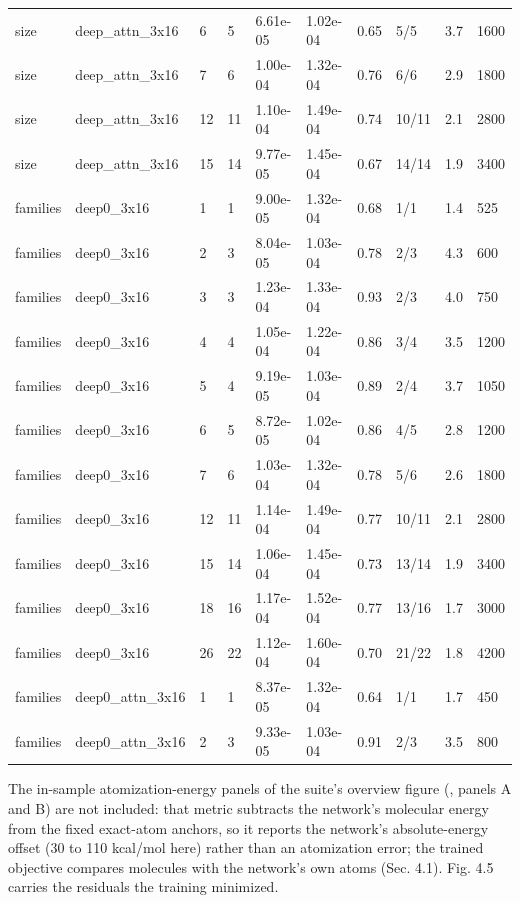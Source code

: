 \documentclass[10pt,a4paper]{article}
\begin{document}
\begin{landscape}
\begin{scriptsize}
\begin{longtable}{llllllllll}
size & deep\_attn\_3x16 & 6 & 5 & 6.61e-05 & 1.02e-04 & 0.65 & 5/5 & 3.7 & 1600 \\
size & deep\_attn\_3x16 & 7 & 6 & 1.00e-04 & 1.32e-04 & 0.76 & 6/6 & 2.9 & 1800 \\
size & deep\_attn\_3x16 & 12 & 11 & 1.10e-04 & 1.49e-04 & 0.74 & 10/11 & 2.1 & 2800 \\
size & deep\_attn\_3x16 & 15 & 14 & 9.77e-05 & 1.45e-04 & 0.67 & 14/14 & 1.9 & 3400 \\
families & deep0\_3x16 & 1 & 1 & 9.00e-05 & 1.32e-04 & 0.68 & 1/1 & 1.4 & 525 \\
families & deep0\_3x16 & 2 & 3 & 8.04e-05 & 1.03e-04 & 0.78 & 2/3 & 4.3 & 600 \\
families & deep0\_3x16 & 3 & 3 & 1.23e-04 & 1.33e-04 & 0.93 & 2/3 & 4.0 & 750 \\
families & deep0\_3x16 & 4 & 4 & 1.05e-04 & 1.22e-04 & 0.86 & 3/4 & 3.5 & 1200 \\
families & deep0\_3x16 & 5 & 4 & 9.19e-05 & 1.03e-04 & 0.89 & 2/4 & 3.7 & 1050 \\
families & deep0\_3x16 & 6 & 5 & 8.72e-05 & 1.02e-04 & 0.86 & 4/5 & 2.8 & 1200 \\
families & deep0\_3x16 & 7 & 6 & 1.03e-04 & 1.32e-04 & 0.78 & 5/6 & 2.6 & 1800 \\
families & deep0\_3x16 & 12 & 11 & 1.14e-04 & 1.49e-04 & 0.77 & 10/11 & 2.1 & 2800 \\
families & deep0\_3x16 & 15 & 14 & 1.06e-04 & 1.45e-04 & 0.73 & 13/14 & 1.9 & 3400 \\
families & deep0\_3x16 & 18 & 16 & 1.17e-04 & 1.52e-04 & 0.77 & 13/16 & 1.7 & 3000 \\
families & deep0\_3x16 & 26 & 22 & 1.12e-04 & 1.60e-04 & 0.70 & 21/22 & 1.8 & 4200 \\
families & deep0\_attn\_3x16 & 1 & 1 & 8.37e-05 & 1.32e-04 & 0.64 & 1/1 & 1.7 & 450 \\
families & deep0\_attn\_3x16 & 2 & 3 & 9.33e-05 & 1.03e-04 & 0.91 & 2/3 & 3.5 & 800 \\
\bottomrule \end{longtable}
\end{scriptsize}
\end{landscape}


The in-sample atomization-energy panels of the suite's overview figure (, panels A and B) are not included: that metric subtracts the network's molecular energy from the fixed exact-atom anchors, so it reports the network's absolute-energy offset (30 to 110 kcal/mol here) rather than an atomization error; the trained objective compares molecules with the network's own atoms (Sec. 4.1). Fig. 4.5 carries the residuals the training minimized.
\end{document}
